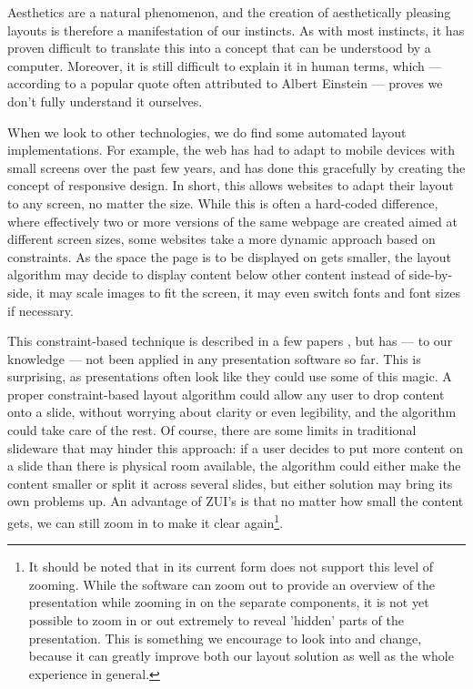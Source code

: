    Aesthetics are a natural phenomenon, and the creation of aesthetically
   pleasing layouts is therefore a manifestation of our instincts. As with most
   instincts, it has proven difficult to translate this into a concept that can
   be understood by a computer. Moreover, it is still difficult to explain it
   in human terms, which --- according to a popular quote often attributed to
   Albert Einstein --- proves we don't fully understand it ourselves.

   When we look to other technologies, we do find some automated layout
   implementations. For example, the web has had to adapt to mobile devices
   with small screens over the past few years, and has done this gracefully by
   creating the concept of responsive design. In short, this allows websites to
   adapt their layout to any screen, no matter the size. While this is often a
   hard-coded difference, where effectively two or more versions of the same
   webpage are created aimed at different screen sizes, some websites take a
   more dynamic approach based on constraints. As the space the page is to be
   displayed on gets smaller, the layout algorithm may decide to display
   content below other content instead of side-by-side, it may scale images to
   fit the screen, it may even switch fonts and font sizes if necessary.

   This constraint-based technique is described in a few papers
   \citep{lok-1,hurst-1}, but has --- to our knowledge --- not been applied in
   any presentation software so far. This is surprising, as presentations often
   look like they could use some of this magic. A proper constraint-based
   layout algorithm could allow any user to drop content onto a slide, without
   worrying about clarity or even legibility, and the algorithm could take care
   of the rest. Of course, there are some limits in traditional slideware that
   may hinder this approach: if a user decides to put more content on a slide
   than there is physical room available, the algorithm could either make the
   content smaller or split it across several slides, but either solution may
   bring its own problems up. An advantage of ZUI's is that no matter how small
   the content gets, we can still zoom in to make it clear again\footnote{It
   should be noted that \mxp in its current form does not support this level of
   zooming. While the software can zoom out to provide an overview of the
   presentation while zooming in on the separate components, it is not yet
   possible to zoom in or out extremely to reveal 'hidden' parts of the
   presentation. This is something we encourage to look into and change,
   because it can greatly improve both our layout solution as well as the whole
   \mxp experience in general.}.

